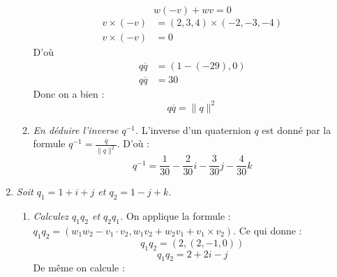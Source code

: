 \documentclass[a4paper,12pt]{article}
\begin{document}
\begin{enumerate}
\begin{enumerate}
              \begin{equation}
              w (-v) + w v = 0
              \end{equation}
              \begin{align}
              v \times (-v) &= (2, 3, 4) \times (-2, -3, -4) \\
              v \times (-v) &= 0
              \end{align}
              D'où              
              \begin{align}
               q \overline{q} &= (1 - (-29), 0 ) \\
               q \overline{q} &= 30
              \end{align}
              Donc on a bien :
              \begin{equation}
              \boxed{q \overline{q} = \lVert q \rVert^2}
              \end{equation}
              \item \emph{En déduire l'inverse \( q^{-1} \).} \newline \newline
              L'inverse d'un quaternion \(q\) est donné par la formule \( q^{-1} = \frac{\overline{q}}{\lVert q \rVert^2} \).
              D'où :
              \begin{equation}
              \boxed{q^{-1}  = \frac{1}{30} - \frac{2}{30} i - \frac{3}{30} j - \frac{4}{30} k }
              \end{equation}
          \end{enumerate}
    \item \emph{Soit \( q_1 = 1 + i + j \) et \( q_2 = 1 - j + k \).}
          \begin{enumerate}
              \item \emph{Calculez \( q_1 q_2 \) et \( q_2 q_1 \).} \newline \newline
              On applique la formule :
              \( q_1 q_2 = (w_1 w_2 − v_1 \cdot v_2, w_1 v_2 + w_2 v_1 + v_1 \times v_2) \). \newline
              Ce qui donne :
              \begin{equation}
              q_1 q_2 = (2, (2, -1, 0))
              \end{equation}
              \begin{equation}
              \boxed{q_1 q_2 = 2 + 2 i - j}
              \end{equation}
              De même on calcule :

\end{enumerate}
\end{enumerate}
\end{document}
